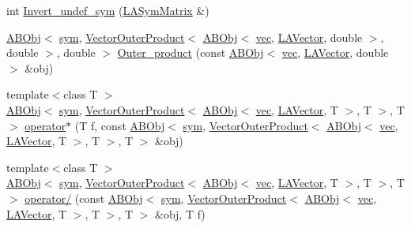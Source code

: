 \begin{DoxyCompactItemize}
int \mbox{\hyperlink{namespaceROOT_1_1Minuit2_a053d4f8b9de7ec9beead27f2ce08be44}{Invert\+\_\+undef\+\_\+sym}} (\mbox{\hyperlink{classROOT_1_1Minuit2_1_1LASymMatrix}{L\+A\+Sym\+Matrix}} \&)
\item 
\mbox{\hyperlink{classROOT_1_1Minuit2_1_1ABObj}{A\+B\+Obj}}$<$ \mbox{\hyperlink{classROOT_1_1Minuit2_1_1sym}{sym}}, \mbox{\hyperlink{classROOT_1_1Minuit2_1_1VectorOuterProduct}{Vector\+Outer\+Product}}$<$ \mbox{\hyperlink{classROOT_1_1Minuit2_1_1ABObj}{A\+B\+Obj}}$<$ \mbox{\hyperlink{classROOT_1_1Minuit2_1_1vec}{vec}}, \mbox{\hyperlink{classROOT_1_1Minuit2_1_1LAVector}{L\+A\+Vector}}, double $>$, double $>$, double $>$ \mbox{\hyperlink{namespaceROOT_1_1Minuit2_a2f3a76ab9b1a9a2ed58cfdc8de6ff704}{Outer\+\_\+product}} (const \mbox{\hyperlink{classROOT_1_1Minuit2_1_1ABObj}{A\+B\+Obj}}$<$ \mbox{\hyperlink{classROOT_1_1Minuit2_1_1vec}{vec}}, \mbox{\hyperlink{classROOT_1_1Minuit2_1_1LAVector}{L\+A\+Vector}}, double $>$ \&obj)
\item 
{\footnotesize template$<$class T $>$ }\\\mbox{\hyperlink{classROOT_1_1Minuit2_1_1ABObj}{A\+B\+Obj}}$<$ \mbox{\hyperlink{classROOT_1_1Minuit2_1_1sym}{sym}}, \mbox{\hyperlink{classROOT_1_1Minuit2_1_1VectorOuterProduct}{Vector\+Outer\+Product}}$<$ \mbox{\hyperlink{classROOT_1_1Minuit2_1_1ABObj}{A\+B\+Obj}}$<$ \mbox{\hyperlink{classROOT_1_1Minuit2_1_1vec}{vec}}, \mbox{\hyperlink{classROOT_1_1Minuit2_1_1LAVector}{L\+A\+Vector}}, T $>$, T $>$, T $>$ \mbox{\hyperlink{namespaceROOT_1_1Minuit2_acfa392f20b9648705bf3750c7f0c842e}{operator$\ast$}} (T f, const \mbox{\hyperlink{classROOT_1_1Minuit2_1_1ABObj}{A\+B\+Obj}}$<$ \mbox{\hyperlink{classROOT_1_1Minuit2_1_1sym}{sym}}, \mbox{\hyperlink{classROOT_1_1Minuit2_1_1VectorOuterProduct}{Vector\+Outer\+Product}}$<$ \mbox{\hyperlink{classROOT_1_1Minuit2_1_1ABObj}{A\+B\+Obj}}$<$ \mbox{\hyperlink{classROOT_1_1Minuit2_1_1vec}{vec}}, \mbox{\hyperlink{classROOT_1_1Minuit2_1_1LAVector}{L\+A\+Vector}}, T $>$, T $>$, T $>$ \&obj)
\item 
{\footnotesize template$<$class T $>$ }\\\mbox{\hyperlink{classROOT_1_1Minuit2_1_1ABObj}{A\+B\+Obj}}$<$ \mbox{\hyperlink{classROOT_1_1Minuit2_1_1sym}{sym}}, \mbox{\hyperlink{classROOT_1_1Minuit2_1_1VectorOuterProduct}{Vector\+Outer\+Product}}$<$ \mbox{\hyperlink{classROOT_1_1Minuit2_1_1ABObj}{A\+B\+Obj}}$<$ \mbox{\hyperlink{classROOT_1_1Minuit2_1_1vec}{vec}}, \mbox{\hyperlink{classROOT_1_1Minuit2_1_1LAVector}{L\+A\+Vector}}, T $>$, T $>$, T $>$ \mbox{\hyperlink{namespaceROOT_1_1Minuit2_aa961ad5b61bfb20977d423945ad1a8f9}{operator/}} (const \mbox{\hyperlink{classROOT_1_1Minuit2_1_1ABObj}{A\+B\+Obj}}$<$ \mbox{\hyperlink{classROOT_1_1Minuit2_1_1sym}{sym}}, \mbox{\hyperlink{classROOT_1_1Minuit2_1_1VectorOuterProduct}{Vector\+Outer\+Product}}$<$ \mbox{\hyperlink{classROOT_1_1Minuit2_1_1ABObj}{A\+B\+Obj}}$<$ \mbox{\hyperlink{classROOT_1_1Minuit2_1_1vec}{vec}}, \mbox{\hyperlink{classROOT_1_1Minuit2_1_1LAVector}{L\+A\+Vector}}, T $>$, T $>$, T $>$ \&obj, T f)

\end{DoxyCompactItemize}
